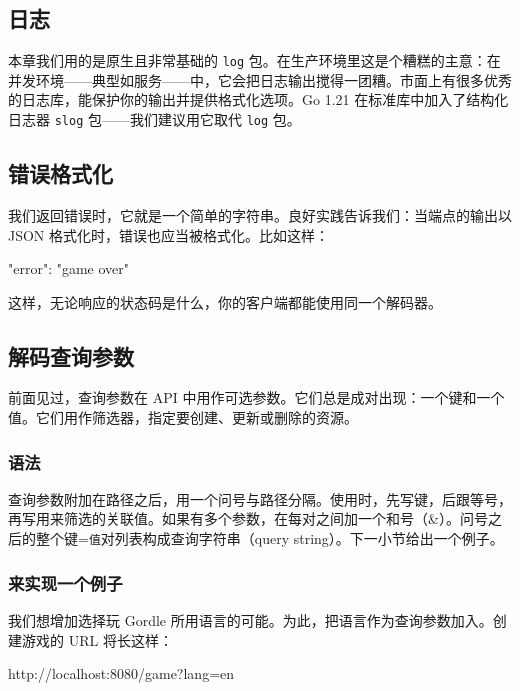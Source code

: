 \subsection{日志}

本章我们用的是原生且非常基础的 \texttt{log} 包。在生产环境里这是个糟糕的主意：在并发环境——典型如服务——中，它会把日志输出搅得一团糟。市面上有很多优秀的日志库，能保护你的输出并提供格式化选项。Go 1.21 在标准库中加入了结构化日志器 \texttt{slog} 包——我们建议用它取代 \texttt{log} 包。

\subsection{错误格式化}

我们返回错误时，它就是一个简单的字符串。良好实践告诉我们：当端点的输出以 JSON 格式化时，错误也应当被格式化。比如这样：

\begin{gocode}[]
{
  "error": "game over"
}
\end{gocode}

这样，无论响应的状态码是什么，你的客户端都能使用同一个解码器。

\subsection{解码查询参数}

前面见过，查询参数在 API 中用作可选参数。它们总是成对出现：一个键和一个值。它们用作筛选器，指定要创建、更新或删除的资源。

\subsubsection*{语法}

查询参数附加在路径之后，用一个问号与路径分隔。使用时，先写键，后跟等号，再写用来筛选的关联值。如果有多个参数，在每对之间加一个和号（\&）。问号之后的整个键=\texttt{值}对列表构成查询字符串（query string）。下一小节给出一个例子。

\subsubsection*{来实现一个例子}

我们想增加选择玩 Gordle 所用语言的可能。为此，把语言作为查询参数加入。创建游戏的 URL 将长这样：

\begin{gocode}[]
http://localhost:8080/game?lang=en
\end{gocode}

